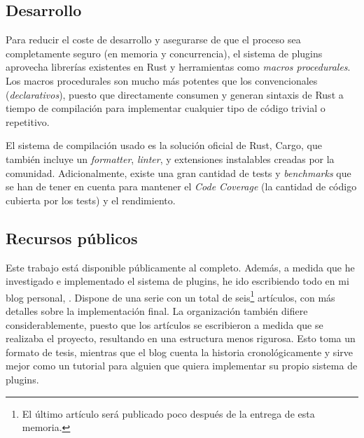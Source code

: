 \subsection{Desarrollo}

Para reducir el coste de desarrollo y asegurarse de que el proceso sea
completamente seguro (en memoria y concurrencia), el sistema de plugins
aprovecha librerías existentes en Rust y herramientas como \emph{macros
procedurales}. Los macros procedurales son mucho más potentes que los
convencionales (\emph{declarativos}), puesto que directamente consumen y generan
sintaxis de Rust a tiempo de compilación para implementar cualquier tipo de
código trivial o repetitivo.

El sistema de compilación usado es la solución oficial de Rust, Cargo, que
también incluye un \emph{formatter}, \emph{linter}, y extensiones instalables
creadas por la comunidad. Adicionalmente, existe una gran cantidad de tests y
\emph{benchmarks} que se han de tener en cuenta para mantener el \emph{Code
Coverage} (la cantidad de código cubierta por los tests) y el rendimiento.

\subsection{Recursos públicos}

Este trabajo está disponible públicamente al completo. Además, a medida que he
investigado e implementado el sistema de plugins, he ido escribiendo todo en mi
blog personal, . Dispone de una serie con un total de
seis\footnote{El último artículo será publicado poco después de la entrega de
esta memoria.} artículos, con más detalles sobre la implementación final. La
organización también difiere considerablemente, puesto que los artículos se
escribieron a medida que se realizaba el proyecto, resultando en una estructura
menos rigurosa. Esto toma un formato de tesis, mientras que el blog cuenta la
historia cronológicamente y sirve mejor como un tutorial para alguien que quiera
implementar su propio sistema de plugins.

